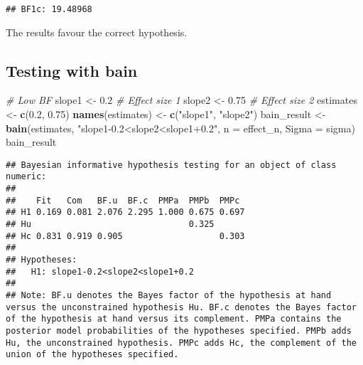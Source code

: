 \documentclass[
]{article}
\newenvironment{Shaded}{\begin{snugshade}}{\end{snugshade}}
\newcommand{\AttributeTok}[1]{\textcolor[rgb]{0.13,0.29,0.53}{#1}}
\newcommand{\CommentTok}[1]{\textcolor[rgb]{0.56,0.35,0.01}{\textit{#1}}}
\newcommand{\FloatTok}[1]{\textcolor[rgb]{0.00,0.00,0.81}{#1}}
\newcommand{\FunctionTok}[1]{\textcolor[rgb]{0.13,0.29,0.53}{\textbf{#1}}}
\newcommand{\NormalTok}[1]{#1}
\newcommand{\OtherTok}[1]{\textcolor[rgb]{0.56,0.35,0.01}{#1}}
\newcommand{\StringTok}[1]{\textcolor[rgb]{0.31,0.60,0.02}{#1}}
\begin{document}
\begin{verbatim}
## BF1c: 19.48968
\end{verbatim}

The results favour the correct hypothesis.

\subsection{Testing with bain}\label{testing-with-bain}

\begin{Shaded}
\begin{Highlighting}[]
\CommentTok{\# Low BF}
\NormalTok{slope1 }\OtherTok{\textless{}{-}} \FloatTok{0.2} \CommentTok{\# Effect size 1}
\NormalTok{slope2 }\OtherTok{\textless{}{-}} \FloatTok{0.75} \CommentTok{\# Effect size 2}
\NormalTok{estimates }\OtherTok{\textless{}{-}} \FunctionTok{c}\NormalTok{(}\FloatTok{0.2}\NormalTok{, }\FloatTok{0.75}\NormalTok{)}
\FunctionTok{names}\NormalTok{(estimates) }\OtherTok{\textless{}{-}} \FunctionTok{c}\NormalTok{(}\StringTok{"slope1"}\NormalTok{, }\StringTok{"slope2"}\NormalTok{)}
\NormalTok{bain\_result }\OtherTok{\textless{}{-}} \FunctionTok{bain}\NormalTok{(estimates, }\StringTok{"slope1{-}0.2\textless{}slope2\textless{}slope1+0.2"}\NormalTok{, }\AttributeTok{n =}\NormalTok{ effect\_n, }\AttributeTok{Sigma =}\NormalTok{ sigma)}
\NormalTok{bain\_result}
\end{Highlighting}
\end{Shaded}

\begin{verbatim}
## Bayesian informative hypothesis testing for an object of class numeric:
## 
##    Fit   Com   BF.u  BF.c  PMPa  PMPb  PMPc 
## H1 0.169 0.081 2.076 2.295 1.000 0.675 0.697
## Hu                               0.325      
## Hc 0.831 0.919 0.905                   0.303
## 
## Hypotheses:
##   H1: slope1-0.2<slope2<slope1+0.2
## 
## Note: BF.u denotes the Bayes factor of the hypothesis at hand versus the unconstrained hypothesis Hu. BF.c denotes the Bayes factor of the hypothesis at hand versus its complement. PMPa contains the posterior model probabilities of the hypotheses specified. PMPb adds Hu, the unconstrained hypothesis. PMPc adds Hc, the complement of the union of the hypotheses specified.
\end{verbatim}
\end{document}
